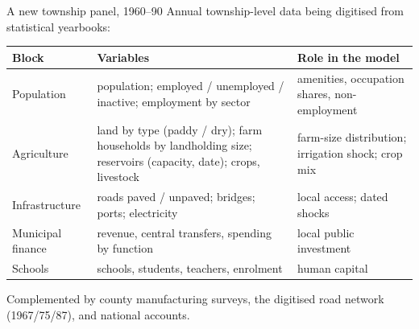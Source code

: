 \documentclass[10pt,aspectratio=169]{beamer}
\begin{document}
\begin{frame}{A new township panel, 1960--90}
  \small
  Annual township-level data being digitised from statistical yearbooks:
  \vspace{0.3em}

  \footnotesize
  \begin{tabular}{@{}L{0.24\textwidth}L{0.42\textwidth}L{0.26\textwidth}@{}}
    \toprule
    Block & Variables & Role in the model \\
    \midrule
    Population & population; employed / unemployed / inactive; employment by sector &
      amenities, occupation shares, non-employment \\
    Agriculture & land by type (paddy / dry); farm households by landholding size;
      reservoirs (capacity, date); crops, livestock & farm-size distribution; irrigation
      shock; crop mix \\
    Infrastructure & roads paved / unpaved; bridges; ports; electricity &
      local access; dated shocks \\
    Municipal finance & revenue, central transfers, spending by function &
      local public investment \\
    Schools & schools, students, teachers, enrolment & human capital \\
    \bottomrule
  \end{tabular}
  \vspace{0.4em}

  \small Complemented by county manufacturing surveys, the digitised road network
  (1967/75/87), and national accounts.
\end{frame}
\end{document}
